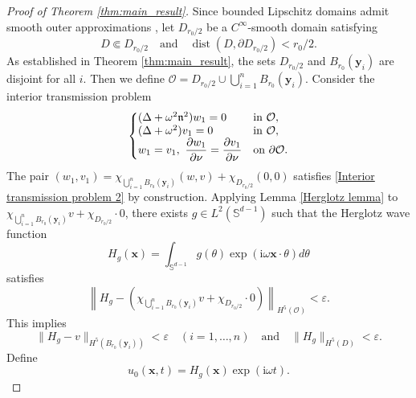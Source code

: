 \documentclass[11pt,reqno,oneside]{amsart}
\numberwithin{equation}{section}
\theoremstyle{definition}
\theoremstyle{remark}
\numberwithin{equation}{section}
\begin{document}
\begin{proof}[Proof of Theorem \ref{thm:main_result}]
		Since bounded Lipschitz domains admit smooth outer approximations \cite{Antonini}, let $D_{r_0/2}$ be a $C^\infty$-smooth domain satisfying
		\begin{equation*}
			D \Subset D_{r_0/2} \quad \text{and} \quad \operatorname{dist}(D, \partial D_{r_0/2}) < r_0/2.
		\end{equation*}
		As established in Theorem \ref{thm:main_result}, the sets \(D_{r_0/2}\) and \(B_{r_0}(\mathbf{y}_i)\) are disjoint for all \(i\). Then we define $\mathcal{O} = D_{r_0/2} \cup \bigcup_{i=1}^{n} B_{r_0}(\mathbf{y}_i)$. Consider the interior transmission problem
		\begin{equation}\label{Interior transmission problem 2}
			\left\{\begin{array}{@{}ll@{}}
				(\Delta + \omega^2 \mathfrak{n}^2) w_1 = 0 & \text{in } \mathcal{O}, \\
				(\Delta + \omega^2) v_1 = 0 & \text{in } \mathcal{O}, \\
				w_1 = v_1,\ \dfrac{\partial w_1}{\partial \nu} = \dfrac{\partial v_1}{\partial \nu} & \text{on } \partial \mathcal{O}.
			\end{array}\right.
		\end{equation}
		The pair $(w_1, v_1) = \chi_{\bigcup_{i=1}^n B_{r_0}(\mathbf{y}_i)} (w,v) + \chi_{D_{r_0/2}} (0,0)$ satisfies \eqref{Interior transmission problem 2} by construction. Applying Lemma \ref{Herglotz lemma} to $\chi_{\bigcup_{i=1}^n B_{r_0}(\mathbf{y}_i)} v + \chi_{D_{r_0/2}} \cdot 0$, there exists $g \in L^2(\mathbb{S}^{d-1})$ such that the Herglotz wave function
		\begin{equation*}
			H_g(\mathbf{x}) = \int_{\mathbb{S}^{d-1}} g(\theta) \exp(\mathrm{i} \omega \mathbf{x} \cdot \theta)  d\theta
		\end{equation*}
		satisfies
		\begin{equation}\label{eq3.14}
			\left\| H_g - \left( \chi_{\bigcup_{i=1}^n B_{r_0}(\mathbf{y}_i)} v + \chi_{D_{r_0/2}} \cdot 0 \right) \right\|_{H^5(\mathcal{O})} < \varepsilon.
		\end{equation}
		This implies
		\begin{equation}\label{important estimate for H_g}
			\| H_g - v \|_{H^5(B_{r_0}(\mathbf{y}_i))} < \varepsilon \quad (i=1,\dots,n) \quad \text{and} \quad \| H_g \|_{H^5(D)} < \varepsilon.
		\end{equation}
		Define
		\begin{equation}\label{u_0}
			u_0(\mathbf{x},t) = H_g(\mathbf{x}) \exp(\mathrm{i} \omega t).
		\end{equation}

\end{proof}
\end{document}
